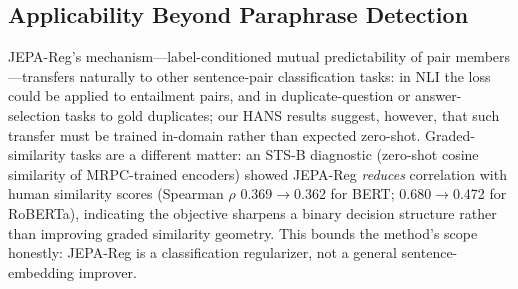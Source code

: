\documentclass[sigconf]{acmart}
\begin{document}
\subsection{Applicability Beyond Paraphrase Detection}
\label{sec:beyond}
JEPA-Reg's mechanism---label-conditioned mutual predictability of pair members---transfers naturally to other sentence-pair classification tasks: in NLI the loss could be applied to entailment pairs, and in duplicate-question or answer-selection tasks to gold duplicates; our HANS results suggest, however, that such transfer must be trained in-domain rather than expected zero-shot. Graded-similarity tasks are a different matter: an STS-B diagnostic (zero-shot cosine similarity of MRPC-trained encoders) showed JEPA-Reg \emph{reduces} correlation with human similarity scores (Spearman $\rho$ 0.369$\rightarrow$0.362 for BERT; 0.680$\rightarrow$0.472 for RoBERTa), indicating the objective sharpens a binary decision structure rather than improving graded similarity geometry. This bounds the method's scope honestly: JEPA-Reg is a classification regularizer, not a general sentence-embedding improver.
\end{document}
